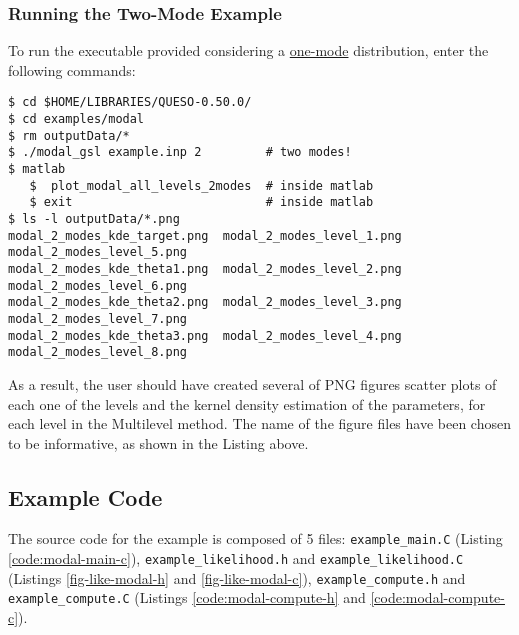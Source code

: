 \subsubsection{Running the Two-Mode Example}
 
To run the executable provided considering a \underline{one-mode} distribution, enter the following commands:
\begin{lstlisting}[label={},caption={Running the example with a two-mode distribution.}]
$ cd $HOME/LIBRARIES/QUESO-0.50.0/
$ cd examples/modal
$ rm outputData/*
$ ./modal_gsl example.inp 2         # two modes!
$ matlab
   $  plot_modal_all_levels_2modes  # inside matlab
   $ exit                           # inside matlab
$ ls -l outputData/*.png
modal_2_modes_kde_target.png  modal_2_modes_level_1.png  modal_2_modes_level_5.png
modal_2_modes_kde_theta1.png  modal_2_modes_level_2.png  modal_2_modes_level_6.png
modal_2_modes_kde_theta2.png  modal_2_modes_level_3.png  modal_2_modes_level_7.png
modal_2_modes_kde_theta3.png  modal_2_modes_level_4.png  modal_2_modes_level_8.png
\end{lstlisting}

As a result, the user should have created several of PNG figures scatter plots of each one of the levels and the kernel density estimation of the parameters, for each level in the Multilevel method. The name of the figure files have been chosen to be informative, as shown in the Listing above. 



\subsection{Example Code}\label{sec:modal-code}

The source code for the example is composed of 5 files:
\texttt{example\_main.C} (Listing \ref{code:modal-main-c}), \linebreak
\texttt{example\_likelihood.h} and \texttt{example\_likelihood.C} (Listings \ref{fig-like-modal-h} and \ref{fig-like-modal-c}),
\texttt{example\_compute.h} and \texttt{example\_compute.C} (Listings \ref{code:modal-compute-h} and \ref{code:modal-compute-c}).






